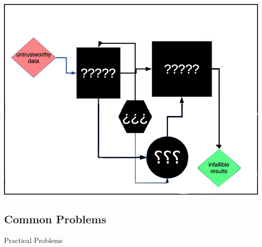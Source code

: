 \documentclass[aspectratio=169,x11names]{beamer}
\begin{document}
\begin{frame}
\begin{center}
\includegraphics[height=0.65\textheight,keepaspectratio]{images/deep_neural_networks_4.png} 
\end{center}
\end{frame}


\subsection{Common Problems}

\begin{frame}
\begin{center}
\huge
Practical Problems
\end{center}
\end{frame}
\end{document}
